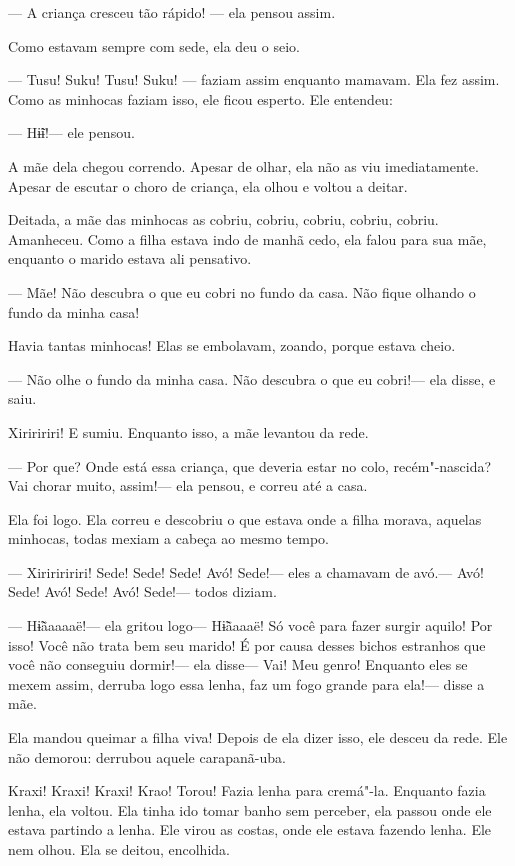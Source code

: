 --- A criança cresceu tão rápido! --- ela pensou assim. 

Como estavam sempre com sede, ela deu o seio. 

--- Tusu! Suku! Tusu! Suku! --- faziam assim enquanto mamavam. Ela
fez assim. Como as minhocas faziam isso, ele ficou esperto. Ele
entendeu: 

--- Hɨ̃ɨ!--- ele pensou. 

A mãe dela chegou correndo. Apesar de olhar, ela não as viu
imediatamente. Apesar de escutar o choro de criança, ela olhou e voltou
a deitar. 

Deitada, a mãe das minhocas as cobriu, cobriu, cobriu, cobriu, cobriu.
Amanheceu. Como a filha estava indo de manhã cedo, ela falou para sua
mãe, enquanto o marido estava ali pensativo.

--- Mãe! Não descubra o que eu cobri no fundo da casa. Não fique olhando
o fundo da minha casa! 

Havia tantas minhocas! Elas se embolavam, zoando, porque estava cheio. 

--- Não olhe o fundo da minha casa. Não descubra o que eu cobri!--- ela
disse, e saiu. 

Xiriririri! E sumiu. Enquanto isso, a mãe levantou da rede. 

--- Por que? Onde está essa criança, que deveria estar no colo,
recém"-nascida? Vai chorar muito, assim!--- ela pensou, e correu até a
casa. 

Ela foi logo. Ela correu e descobriu o que estava onde a filha morava,
aquelas minhocas, todas mexiam a cabeça ao mesmo tempo. 

--- Xiririririri! Sede! Sede! Sede! Avó! Sede!--- eles a chamavam de
avó.--- Avó! Sede! Avó! Sede! Avó! Sede!--- todos diziam. 

--- Hɨ̃ãaaaaë!--- ela gritou logo--- Hɨ̃ãaaaë! Só você para fazer surgir
aquilo! Por isso! Você não trata bem seu marido! É por causa desses
bichos estranhos que você não conseguiu dormir!--- ela disse--- Vai! Meu
genro! Enquanto eles se mexem assim, derruba logo essa lenha, faz um fogo
grande para ela!--- disse a mãe. 

Ela mandou queimar a filha viva! Depois de ela dizer isso, ele desceu da
rede. Ele não demorou: derrubou aquele carapanã-uba.

Kraxi! Kraxi! Kraxi! Krao! Torou! Fazia lenha para cremá"-la. Enquanto
fazia lenha, ela voltou. Ela tinha ido tomar banho sem perceber, ela passou
onde ele estava partindo a lenha. Ele virou as costas, onde ele estava fazendo
lenha. Ele nem olhou. Ela se deitou, encolhida. 

